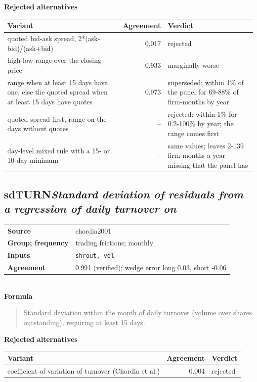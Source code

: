 \documentclass[11pt]{article}
\begin{document}
\textbf{Rejected alternatives}\\[2pt]
{\small\begin{longtable}{@{}p{9.6cm}rp{4.3cm}@{}}
\toprule Variant & Agreement & Verdict\\\midrule\endhead
quoted bid-ask spread, 2*(ask-bid)/(ask+bid) & 0.017 & rejected\\
high-low range over the closing price & 0.933 & marginally worse\\
range when at least 15 days have one, else the quoted spread when at least 15 days have quotes & 0.973 & superseded: within 1\% of the panel for 69-88\% of firm-months by year\\
quoted spread first, range on the days without quotes & -- & rejected: within 1\% for 0.2-100\% by year; the range comes first\\
day-level mixed rule with a 15- or 10-day minimum & -- & same values; leaves 2-139 firm-months a year missing that the panel has\\
\bottomrule\end{longtable}}
\subsection*{sdTURN\quad\normalfont\itshape Standard deviation of residuals from a regression of daily turnover on}
\begin{tabular}{@{}p{3.3cm}p{12.3cm}@{}}
\textbf{Source} & chordia2001\\
\textbf{Group; frequency} & trading frictions; monthly\\
\textbf{Inputs} & \texttt{shrout, vol}\\
\textbf{Agreement} & 0.991 (verified); wedge error long 0.03, short -0.06\\
\end{tabular}\\[4pt]
\textbf{Formula}
\begin{quote}\small
Standard deviation within the month of daily turnover (volume over shares\\
outstanding), requiring at least 15 days.\\

\end{quote}
\textbf{Rejected alternatives}\\[2pt]
{\small\begin{longtable}{@{}p{9.6cm}rp{4.3cm}@{}}
\toprule Variant & Agreement & Verdict\\\midrule\endhead
coefficient of variation of turnover (Chordia et al.) & 0.004 & rejected\\
\bottomrule\end{longtable}}
\end{document}

